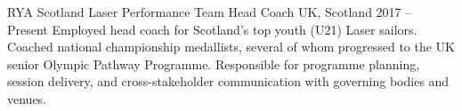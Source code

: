 
  \cventry
    {RYA Scotland} %
    {Laser Performance Team Head Coach} %
    {UK, Scotland} %
    {2017 – Present} %
    {
      Employed head coach for Scotland's top youth (U21) Laser sailors. Coached national championship medallists, several of whom progressed to the UK senior Olympic Pathway Programme. Responsible for programme planning, session delivery, and cross-stakeholder communication with governing bodies and venues.
    }

